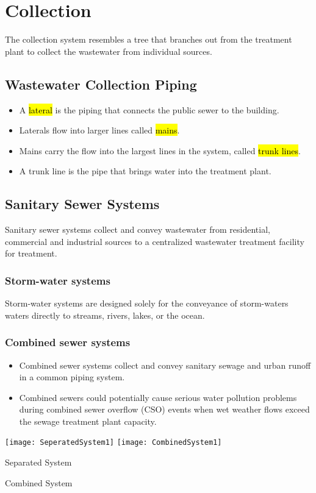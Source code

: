 \newpage
\section{Collection}	
The collection system resembles a tree that branches out from the treatment plant to collect the wastewater from individual sources.

\subsection{Wastewater Collection Piping}	
	\begin{itemize}
		\item A \hl{lateral} is the piping that connects the public sewer to the building. 
		\item Laterals flow into larger lines called \hl{mains}.
		\item Mains carry the flow into the largest lines in the system, called \hl{trunk lines}. 
		\item A trunk line is the pipe that brings water into the treatment plant.
	\end{itemize}
\subsection{Sanitary Sewer Systems}

Sanitary sewer systems collect and convey wastewater from residential, commercial and industrial sources to a centralized wastewater treatment facility for treatment. 

\subsubsection{Storm-water systems}

Storm-water systems are designed solely for the conveyance of storm-waters waters directly to streams, rivers, lakes, or the ocean.
 
\subsubsection{Combined sewer systems}
\begin{itemize}
\item Combined sewer systems collect and convey sanitary sewage and urban runoff in a common piping system.
\item Combined sewers could potentially cause serious water pollution problems during combined sewer overflow (CSO) events when wet weather flows exceed the sewage treatment plant capacity.
	\end{itemize}
\begin{center}
\texttt{[image: SeperatedSystem1]} \hspace{1 cm} \texttt{[image: CombinedSystem1]}
\end{center}
			\hspace{2.6cm} Separated System \hspace{3.2cm} \parbox{\textwidth}{Combined System}\\

